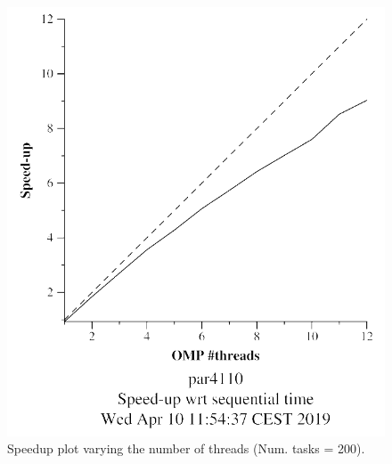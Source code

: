 \documentclass[12pt, a4paper]{article}
\begin{document}
\begin{figure}[H]
\begin{minipage}[b]{0.4\linewidth}
  \includegraphics[scale=0.5]{./mandel-omp-10000-strong-omp-3-200-speedup}
  \caption{Speedup plot varying the number of threads (Num. tasks = 200).}
  \label{fig:mandel-omp-10000-strong-omp-3-200-speedup}
\end{minipage}
\end{figure}
\end{document}
